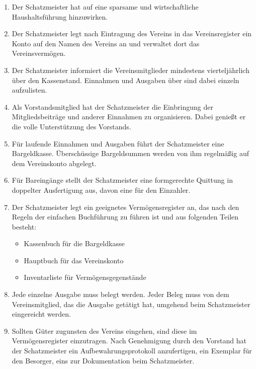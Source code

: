 \documentclass[fontsize=12pt,paper=a4,pagesize,headings=small]{scrartcl}
\begin{document}
\begin{enumerate}
    \item Der Schatzmeister hat auf eine sparsame und wirtschaftliche
        Haushaltsführung hinzuwirken.

    \item Der Schatzmeister legt nach Eintragung des Vereins in das
        Vereinsregister ein Konto auf den Namen des Vereins an und
        verwaltet dort das Vereinsvermögen.

    \item Der Schatzmeister informiert die Vereinsmitglieder
        mindestens vierteljährlich über den
        Kassenstand. Einnahmen und Ausgaben über  sind dabei
        einzeln aufzulisten.

    \item Als Vorstandsmitglied hat der Schatzmeister die Einbringung der
        Mitgliedsbeiträge und anderer Einnahmen zu organisieren. Dabei
        genießt er die volle Unterstützung des Vorstands.

    \item Für laufende Einnahmen und Ausgaben führt der Schatzmeister eine
        Bargeldkasse. Überschüssige Bargeldsummen werden von ihm regelmäßig
        auf dem Vereinskonto abgelegt.

    \item Für Bareingänge stellt der Schatzmeister eine formgerechte
        Quittung in doppelter Ausfertigung aus, davon eine für den Einzahler.

    \item Der Schatzmeister legt ein geeignetes Vermögensregister an, das
        nach den Regeln der einfachen Buchführung zu führen ist und aus
        folgenden Teilen besteht:
        \begin{itemize}
            \item Kassenbuch für die Bargeldkasse
            \item Hauptbuch für das Vereinskonto
            \item Inventarliste für Vermögensgegenstände
        \end{itemize}

    \item Jede einzelne Ausgabe muss belegt werden. Jeder Beleg muss von
        dem Vereinsmitglied, das die Ausgabe getätigt hat, umgehend beim
        Schatzmeister eingereicht werden.

    \item Sollten Güter zugunsten des Vereins eingehen, sind diese im
        Vermögensregister einzutragen. Nach Genehmigung durch den Vorstand hat
        der Schatzmeister ein Aufbewahrungsprotokoll anzufertigen, ein Exemplar
        für den Besorger, eins zur Dokumentation beim Schatzmeister.


\end{enumerate}
\end{document}
